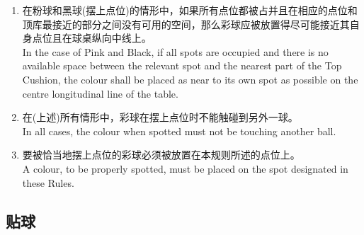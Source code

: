 \begin{enumerate}[label=(\alph*)]
    \item 在粉球和黑球(摆上点位)的情形中，如果所有点位都被占并且在相应的点位和顶库最接近的部分之间没有可用的空间，那么彩球应被放置得尽可能接近其自身点位且在球桌纵向中线上。\\
    In the case of Pink and Black, if all spots are occupied and there is no available space between the relevant spot and the nearest part of the Top Cushion, the colour shall be placed as near to its own spot as possible on the centre longitudinal line of the table.
    \item 在(上述)所有情形中，彩球在摆上点位时不能触碰到另外一球。\\
    In all cases, the colour when spotted must not be touching another ball.
    \item 要被恰当地摆上点位的彩球必须被放置在本规则所述的点位上。\\
    A colour, to be properly spotted, must be placed on the spot designated in these Rules.
\end{enumerate}

\subsection{贴球}

